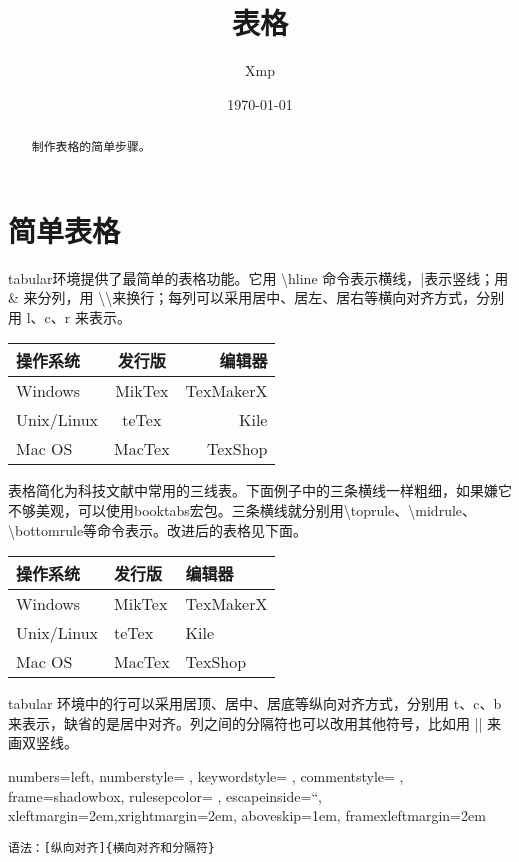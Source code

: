 \documentclass[UTF8]{article}
\title{表格}
\author{Xmp}
\date{\today}
\begin{document}
\maketitle
\setcounter{tocdepth}{7}
\tableofcontents

\begin{abstract}
	制作表格的简单步骤。
\end{abstract}

\section{简单表格}
tabular环境提供了最简单的表格功能。它用 \textbackslash hline 命令表示横线，|表示竖线；用 \& 来分列，用 \textbackslash \textbackslash 来换行；每列可以采用居中、居左、居右等横向对齐方式，分别用 l、c、r 来表示。

\begin{tabular}{|l |c|r|}
	\hline
	操作系统 & 发行版 & 编辑器 \\
	\hline
	Windows & MikTex & TexMakerX \\
	\hline
	Unix/Linux & teTex & Kile \\
	\hline
	Mac OS & MacTex & TexShop \\
	\hline
\end{tabular}

表格简化为科技文献中常用的三线表。下面例子中的三条横线一样粗细，如果嫌它不够美观，可以使用booktabs宏包。三条横线就分别用\textbackslash toprule、\textbackslash midrule、\textbackslash bottomrule等命令表示。改进后的表格见下面。
\begin{table}[htbp]
\centering
\begin{tabular}{lll}
	\toprule
	操作系统 & 发行版 & 编辑器 \\	
	\midrule
	Windows & MikTex & TexMakerX \\
	Unix/Linux & teTex & Kile \\
	Mac OS & MacTex & TexShop \\
	\bottomrule
\end{tabular}
\end{table}

tabular 环境中的行可以采用居顶、居中、居底等纵向对齐方式，分别用 t、c、b 来表示，缺省的是居中对齐。列之间的分隔符也可以改用其他符号，比如用 || 来画双竖线。

\lstset
{
	numbers=left, 
	numberstyle= \tiny, 
	keywordstyle= \color{ blue!70},
	commentstyle= \color{red!50!green!50!blue!50}, 
	frame=shadowbox, %
	rulesepcolor= \color{ red!20!green!20!blue!20} ,
	escapeinside=``, %
	xleftmargin=2em,xrightmargin=2em, aboveskip=1em,
	framexleftmargin=2em
}
\begin{lstlisting}
语法：[纵向对齐]{横向对齐和分隔符}
\end{lstlisting}
\end{document}
